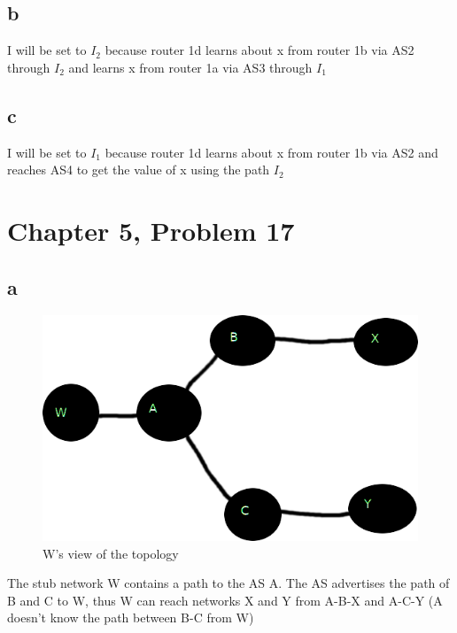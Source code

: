 \documentclass{article}
\begin{document}
\subsection*{b}
I will be set to $I_2$ because router 1d learns about x from router 1b via AS2 through $I_2$ and learns x from router 1a via AS3 through $I_1$\\

\subsection*{c}
I will be set to $I_1$ because router 1d learns about x from router 1b via AS2 and reaches AS4 to get the value of x using the path $I_2$\\
\clearpage

\section*{Chapter 5, Problem 17}
\subsection*{a}
\begin{figure}[h!]
\centering
\includegraphics[scale=0.5]{Q17a.png}
\caption{W's view of the topology}
\end{figure}
The stub network W contains a path to the AS A.  The AS advertises the path of B and C to W, thus W can reach networks X and Y from A-B-X and A-C-Y (A doesn't know the path between B-C from W)\\
\end{document}
